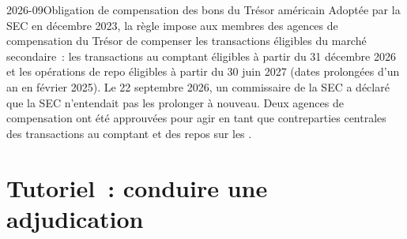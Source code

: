 \begin{dated}{2026-09}{Obligation de compensation des bons du Trésor américain}\label{dat:m2:the-treasury-market:clearing}
Adoptée par la SEC en décembre 2023, la règle impose aux membres des agences de compensation du
Trésor de compenser les transactions éligibles du marché secondaire~: les transactions au comptant
éligibles à partir du 31 décembre 2026 et les opérations de repo éligibles à partir du 30 juin 2027 (dates
prolongées d'un an en février 2025). Le 22 septembre 2026, un commissaire de la SEC
a déclaré que la SEC n'entendait pas les prolonger à nouveau. Deux agences de compensation ont été
approuvées pour agir en tant que contreparties centrales des transactions au comptant et des repos sur les .
\end{dated}

\section{Tutoriel~: conduire une adjudication}\label{tut:m2:the-treasury-market:auction}

